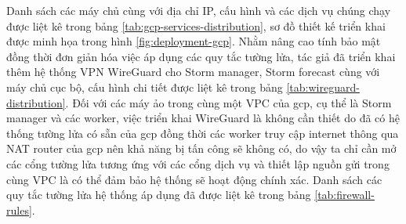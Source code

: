 \begin{table}[h]
    \centering
    \caption{Bảng danh sách các quy tắc tường lửa}
    \label{tab:firewall-rules}
\end{table}

Danh sách các máy chủ cùng với địa chỉ IP, cấu hình và các dịch vụ chúng chạy được liệt kê trong bảng \ref{tab:gcp-services-distribution}, sơ đồ thiết kế triển khai được minh họa trong hình \ref{fig:deployment-gcp}. Nhằm nâng cao tính bảo mật đồng thời đơn giản hóa việc áp dụng các quy tắc tường lửa, tác giả đã triển khai thêm hệ thống VPN WireGuard cho Storm manager, Storm forecast cùng với máy chủ cục bộ, cấu hình chi tiết được liệt kê trong bảng \ref{tab:wireguard-distribution}. Đối với các máy ảo trong cùng một VPC của \gls{gcp}, cụ thể là Storm manager và các worker, việc triển khai WireGuard là không cần thiết do đã có hệ thống tường lửa có sẵn của \gls{gcp} đồng thời các worker truy cập internet thông qua NAT router của \gls{gcp} nên khả năng bị tấn công sẽ không có, do vậy ta chỉ cần mở các cổng tường lửa tương ứng với các cổng dịch vụ và thiết lập nguồn gửi trong cùng VPC là có thể đảm bảo hệ thống sẽ hoạt động chính xác. Danh sách các quy tắc tường lửa hệ thống áp dụng đã được liệt kê trong bảng \ref{tab:firewall-rules}.

